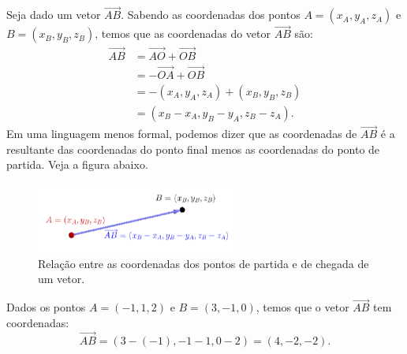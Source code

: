\begin{obs}
  Seja dado um vetor $\overrightarrow{AB}$. Sabendo as coordenadas dos pontos $A = (x_A,y_A,z_A)$ e $B = (x_B,y_B,z_B)$, temos que as coordenadas do vetor $\overrightarrow{AB}$ são:
  \begin{align}
    \overrightarrow{AB} &= \overrightarrow{AO} + \overrightarrow{OB}\\
                        &= -\overrightarrow{OA} + \overrightarrow{OB}\\
                        &= -(x_A,y_A,z_A)+(x_B,y_B,z_B)\\
                        &= (x_B-x_A,y_B-y_A,z_B-z_A).
  \end{align}
  Em uma linguagem menos formal, podemos dizer que as coordenadas de $\overrightarrow{AB}$ é a resultante das coordenadas do ponto final menos as coordenadas do ponto de partida. Veja a figura abaixo.

\begin{figure}[H]
  \centering
  \includegraphics[width=0.6\textwidth]{./cap_scoord/dados/fig_scoord_vec_pt/fig}
  \caption{Relação entre as coordenadas dos pontos de partida e de chegada de um vetor.}
  \label{fig:scoord_vec_pt}
\end{figure}  
\end{obs}

\begin{ex}
  Dados os pontos $A = (-1,1,2)$ e $B = (3,-1,0)$, temos que o vetor $\overrightarrow{AB}$ tem coordenadas:
  \begin{equation}
    \overrightarrow{AB} = (3-(-1),-1-1,0-2) = (4,-2,-2).
  \end{equation}
\end{ex}

